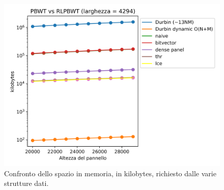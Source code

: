 \begin{figure}
  \centering
  \includegraphics[scale = 0.6]{img/pbwt_vs_rlpbwt_dyn.png}
  \caption{Confronto dello spazio in memoria, in kilobytes, richiesto dalle
    varie strutture dati.} 
  \label{memcomp1}
\end{figure}
